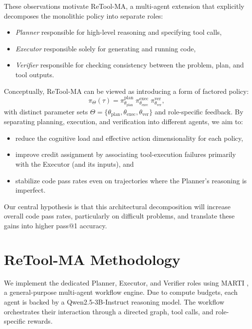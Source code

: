 \documentclass{article}
\begin{document}
These observations motivate ReTool-MA, a multi-agent extension that 
explicitly decomposes the monolithic policy into separate roles: 
\begin{itemize}
  \item \emph{Planner} responsible for high-level reasoning and specifying tool calls, 
  \item \emph{Executor} responsible solely for generating and running code, 
  \item \emph{Verifier} responsible for checking consistency between the problem, plan, and tool outputs.
\end{itemize}
Conceptually, ReTool-MA can be viewed as introducing a form of factored policy:
\begin{equation}
  \pi_\Theta(\tau) 
  = \pi_{\theta_{\text{plan}}}^{\text{plan}} \;
    \pi_{\theta_{\text{exec}}}^{\text{exec}} \;
    \pi_{\theta_{\text{ver}}}^{\text{ver}},
\end{equation}
with distinct parameter sets 
$\Theta = \{\theta_{\text{plan}}, \theta_{\text{exec}}, \theta_{\text{ver}}\}$ 
and role-specific feedback. By separating planning, execution, and verification 
into different agents, we aim to:
\begin{itemize}
  \item reduce the cognitive load and effective action dimensionality for each 
        policy,
  \item improve credit assignment by associating tool-execution failures 
        primarily with the Executor (and its inputs), and
  \item stabilize code pass rates even on trajectories where the Planner's 
        reasoning is imperfect.
\end{itemize}
Our central hypothesis is that this architectural decomposition will
increase overall code pass rates, particularly on difficult problems, and 
translate these gains into higher pass@1 accuracy.

\section{ReTool-MA Methodology}
We implement the dedicated Planner, Executor, and Verifier roles using MARTI
\citep{marti2025}, a general-purpose multi-agent workflow engine. 
Due to compute budgets, each agent is backed by a Qwen2.5-3B-Instruct \citep{qwen2.5, qwen2}
reasoning model. The workflow orchestrates their interaction through a directed 
graph, tool calls, and role-specific rewards.
\end{document}
